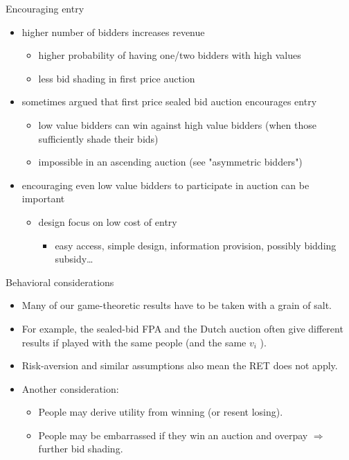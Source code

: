 \documentclass[bigger]{beamer}
\newcommand{\Ra}{\Rightarrow} \newcommand{\ra}{\rightarrow} \newcommand{\Lra}{\Leftrightarrow}
\begin{document}
\begin{frame}[label={sec:org5ba2309}]{Encouraging entry}
\begin{itemize}
\item higher number of bidders increases revenue
\begin{itemize}
\item higher probability of having one/two bidders with high values
\item less bid shading in first price auction
\end{itemize}
\item sometimes argued that first price sealed bid auction encourages entry
\begin{itemize}
\item low value bidders can win against high value bidders (when those sufficiently shade their bids)
\item impossible in an ascending auction (see "asymmetric bidders")
\end{itemize}
\item encouraging even low value bidders to participate in auction can be important
\begin{itemize}
\item design focus on low cost of entry
\begin{itemize}
\item easy access, simple design, information provision, possibly bidding subsidy\ldots{}
\end{itemize}
\end{itemize}
\end{itemize}
\end{frame}
\begin{frame}[label={sec:orgb7c8e44}]{Behavioral considerations}
\begin{itemize}
\item Many of our game-theoretic results have to be taken with a grain of salt.
\item For example, the sealed-bid FPA and the Dutch auction often give different results if played with the same people (and the same \(v_i\) ).
\item Risk-aversion and similar assumptions also mean the RET does not apply.
\item Another consideration:
\begin{itemize}
\item People may derive utility from winning (or resent losing).
\item People may be embarrassed if they win an auction and overpay \(\Ra\) further bid shading.
\end{itemize}
\end{itemize}
\end{frame}
\end{document}
